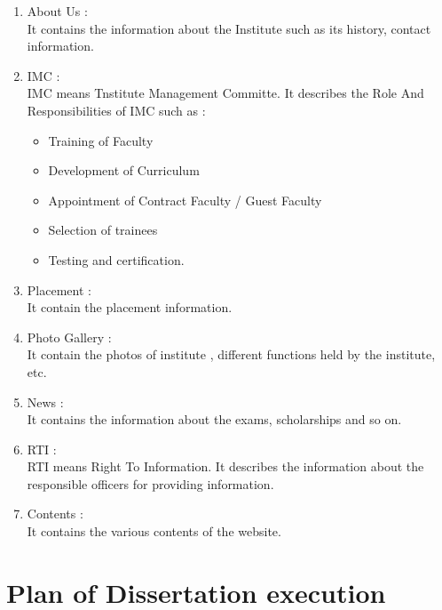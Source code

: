 \documentclass[11pt,a4paper,oneside,openright]{report}
\begin{document}
{{\begin{enumerate}
\item About Us :  \\
It contains the information about the Institute such as its history, contact information.

\item IMC :  \\
\hspace{0.2in}IMC means Tnstitute Management Committe. It describes the Role And Responsibilities of IMC such as :
\begin{itemize}
\item Training of Faculty
\item Development of Curriculum
\item Appointment of Contract Faculty / Guest Faculty
\item Selection of trainees
\item Testing and certification.
\end{itemize}

\item Placement :\\
\hspace{0.2in}It contain the placement information.

\item Photo Gallery :\\
\hspace{0.2in}It contain the photos of institute , different functions held by the institute, etc.


\item News :\\
\hspace{0.2in}It contains the information about the exams, scholarships and so on.

\item RTI :\\
\hspace{0.2in}RTI means Right To Information. It describes the information about the responsible officers for providing information.

\item Contents :\\
\hspace{0.2in}It contains the various contents of the website.

\end{enumerate}





\chapter{Plan of Dissertation execution}


}}
\end{document}
